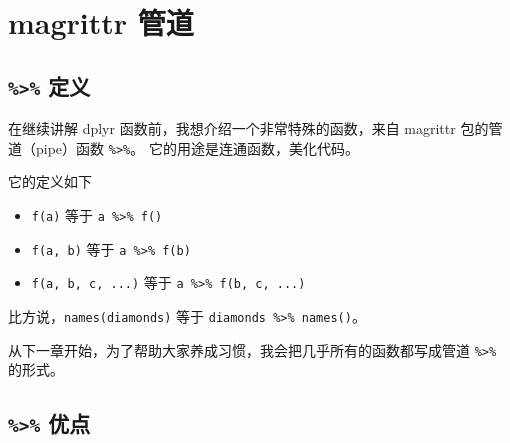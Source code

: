 \documentclass[
  letterpaper,
]{ctexbook}
\providecommand{\tightlist}{%
  \setlength{\itemsep}{0pt}\setlength{\parskip}{0pt}}\usepackage{longtable,booktabs,array}
\begin{document}
\hypertarget{magrittr-ux7ba1ux9053}{%
\chapter{magrittr 管道}\label{magrittr-ux7ba1ux9053}}

\hypertarget{ux5b9aux4e49}{%
\section{\texorpdfstring{\texttt{\%\textgreater{}\%}
定义}{\%\textgreater\% 定义}}\label{ux5b9aux4e49}}

在继续讲解 dplyr 函数前，我想介绍一个非常特殊的函数，来自 magrittr
包的管道（pipe）函数 \texttt{\%\textgreater{}\%}。
它的用途是连通函数，美化代码。

它的定义如下

\begin{itemize}
\tightlist
\item
  \texttt{f(a)} 等于 \texttt{a\ \%\textgreater{}\%\ f()}
\item
  \texttt{f(a,\ b)} 等于 \texttt{a\ \%\textgreater{}\%\ f(b)}
\item
  \texttt{f(a,\ b,\ c,\ ...)} 等于
  \texttt{a\ \%\textgreater{}\%\ f(b,\ c,\ ...)}
\end{itemize}

比方说，\texttt{names(diamonds)} 等于
\texttt{diamonds\ \%\textgreater{}\%\ names()}。

\begin{tcolorbox}[enhanced jigsaw, bottomtitle=1mm, bottomrule=.15mm, coltitle=black, title=\textcolor{quarto-callout-warning-color}{\faExclamationTriangle}\hspace{0.5em}{警告}, toptitle=1mm, colframe=quarto-callout-warning-color-frame, colbacktitle=quarto-callout-warning-color!10!white, opacitybacktitle=0.6, arc=.35mm, opacityback=0, breakable, toprule=.15mm, left=2mm, titlerule=0mm, rightrule=.15mm, colback=white, leftrule=.75mm]

从下一章开始，为了帮助大家养成习惯，我会把几乎所有的函数都写成管道
\texttt{\%\textgreater{}\%} 的形式。

\end{tcolorbox}

\hypertarget{ux4f18ux70b9}{%
\section{\texorpdfstring{\texttt{\%\textgreater{}\%}
优点}{\%\textgreater\% 优点}}\label{ux4f18ux70b9}}
\end{document}
